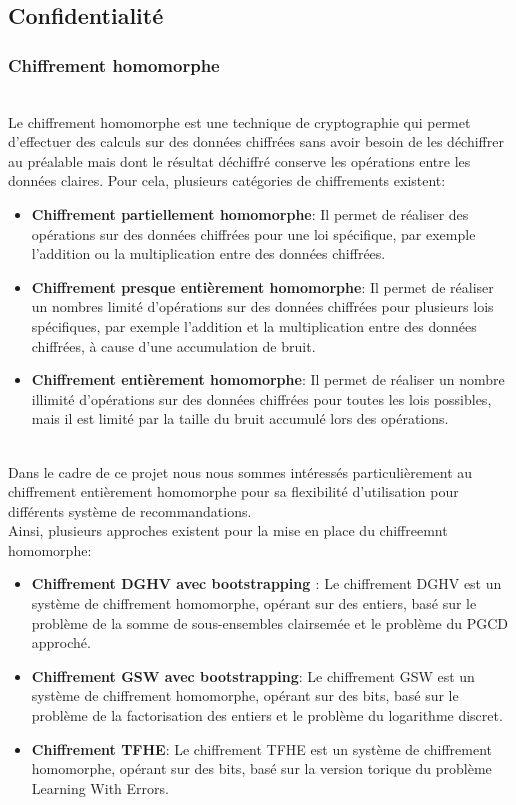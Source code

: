 \documentclass{article}
\begin{document}
\subsection{Confidentialité}
\subsubsection{Chiffrement homomorphe}
$ $\\
    Le chiffrement homomorphe est une technique de cryptographie qui permet d'effectuer des calculs sur des données chiffrées sans avoir besoin de les déchiffrer au préalable mais dont le résultat déchiffré conserve les opérations entre les données claires.
    Pour cela, plusieurs catégories de chiffrements existent:\\
    \begin{itemize}
        \item \textbf{Chiffrement partiellement homomorphe}: Il permet de réaliser des opérations sur des données chiffrées pour une loi spécifique, par exemple l'addition ou la multiplication entre des données chiffrées.
        \item \textbf{Chiffrement presque entièrement homomorphe}: Il permet de réaliser un nombres limité d'opérations sur des données chiffrées pour plusieurs lois spécifiques, par exemple l'addition et la multiplication entre des données chiffrées, à cause d'une accumulation de bruit.
        \item \textbf{Chiffrement entièrement homomorphe}: Il permet de réaliser un nombre illimité d'opérations sur des données chiffrées pour toutes les lois possibles, mais il est limité par la taille du bruit accumulé lors des opérations.
    \end{itemize}
    $ $\\
    Dans le cadre de ce projet nous nous sommes intéressés particulièrement au chiffrement entièrement homomorphe pour sa flexibilité d'utilisation pour différents système de recommandations.\\
    Ainsi, plusieurs approches existent pour la mise en place du chiffreemnt homomorphe: \\
    \begin{itemize}
        \item \textbf{Chiffrement DGHV avec bootstrapping \cite{boots}}: Le chiffrement DGHV \cite{dghv} est un système de chiffrement homomorphe, opérant sur des entiers, basé sur le problème de la somme de sous-ensembles clairsemée et le problème du PGCD approché.
        \item \textbf{Chiffrement GSW avec bootstrapping\cite{boots}}: Le chiffrement GSW \cite{gsw} est un système de chiffrement homomorphe, opérant sur des bits, basé sur le problème de la factorisation des entiers et le problème du logarithme discret.
        \item \textbf{Chiffrement TFHE}: Le chiffrement TFHE \cite{tfhe} est un système de chiffrement homomorphe, opérant sur des bits, basé sur la version torique du problème Learning With Errors.
    \end{itemize}
\end{document}
